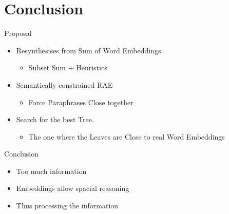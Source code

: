 \documentclass[12pt,landscape,english]{beamer}
\begin{document}
\section{Conclusion}
\begin{frame}{Proposal}
	\begin{itemize}
		\item Resynthesises from Sum of Word Embeddings
		\begin{itemize}
			\item Subset Sum + Heuristics
		\end{itemize}
		\item Semantically constrained RAE
		\begin{itemize}
			\item Force Paraphrases Close together
		\end{itemize}
		\item Search for the best Tree.
		\begin{itemize}
			\item The one where the Leaves are Close to real Word Embeddings
		\end{itemize}
	\end{itemize}

\end{frame}


\begin{frame}{Conclusion}
	\begin{itemize}
		\item Too much information
		\item Embeddings allow spacial reasoning
		\item Thus processing the information
	\end{itemize}
		\centering{}
\end{frame}
\end{document}
